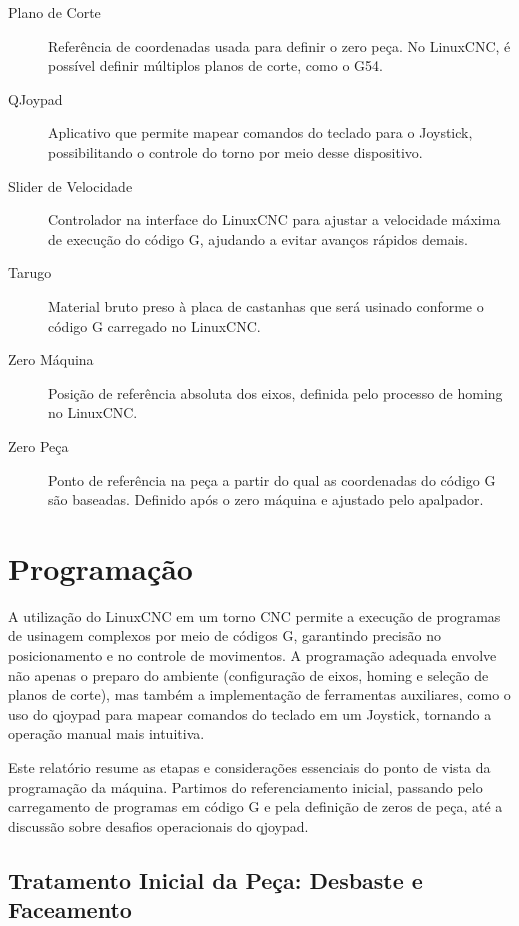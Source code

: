 \documentclass[twoside,a4paper]{refart}
\begin{document}
\begin{description}
	\item[Plano de Corte] Referência de coordenadas usada para definir o zero peça. No LinuxCNC, é possível definir múltiplos planos de corte, como o G54.
	
	\item[QJoypad] Aplicativo que permite mapear comandos do teclado para o Joystick, possibilitando o controle do torno por meio desse dispositivo.
	
	\item[Slider de Velocidade] Controlador na interface do LinuxCNC para ajustar a velocidade máxima de execução do código G, ajudando a evitar avanços rápidos demais.
	
	\item[Tarugo] Material bruto preso à placa de castanhas que será usinado conforme o código G carregado no LinuxCNC.
	
	\item[Zero Máquina] Posição de referência absoluta dos eixos, definida pelo processo de homing no LinuxCNC.
	
	\item[Zero Peça] Ponto de referência na peça a partir do qual as coordenadas do código G são baseadas. Definido após o zero máquina e ajustado pelo apalpador.
\end{description}



\chapter{Programação}

A utilização do LinuxCNC em um torno CNC permite a execução de programas de usinagem complexos por meio de códigos G, garantindo precisão no posicionamento e no controle de movimentos. A programação adequada envolve não apenas o preparo do ambiente (configuração de eixos, homing e seleção de planos de corte), mas também a implementação de ferramentas auxiliares, como o uso do qjoypad para mapear comandos do teclado em um Joystick, tornando a operação manual mais intuitiva.

Este relatório resume as etapas e considerações essenciais do ponto de vista da programação da máquina. Partimos do referenciamento inicial, passando pelo carregamento de programas em código G e pela definição de zeros de peça, até a discussão sobre desafios operacionais do qjoypad.

\section{Tratamento Inicial da Peça: Desbaste e Faceamento}
\end{document}
